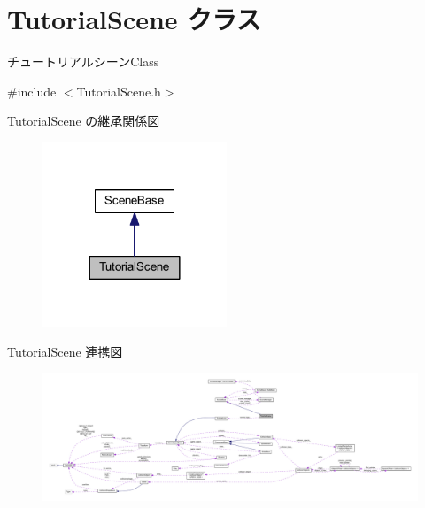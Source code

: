 \hypertarget{class_tutorial_scene}{}\section{Tutorial\+Scene クラス}
\label{class_tutorial_scene}


チュートリアルシーン\+Class  




{\ttfamily \#include $<$Tutorial\+Scene.\+h$>$}



Tutorial\+Scene の継承関係図
\nopagebreak
\begin{figure}[H]
\begin{center}
\leavevmode
\includegraphics[width=156pt]{class_tutorial_scene__inherit__graph}
\end{center}
\end{figure}


Tutorial\+Scene 連携図
\nopagebreak
\begin{figure}[H]
\begin{center}
\leavevmode
\includegraphics[width=350pt]{class_tutorial_scene__coll__graph}
\end{center}
\end{figure}
